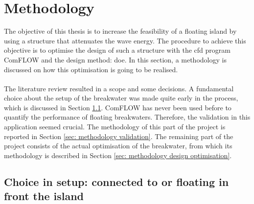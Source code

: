 \chapter{Methodology}
\label{ch: methodolgy}

The objective of this thesis is to increase the feasibility of a floating island by using a structure that attenuates the wave energy. The procedure to achieve this objective is to optimise the design of such a structure with the \acrfull{cfd} program ComFLOW and the design method: \acrfull{doe}. In this section, a methodology is discussed on how this optimisation is going to be realised. \\
\\
The literature review resulted in a scope and some decisions. A fundamental choice about the setup of the breakwater was made quite early in the process, which is discussed in Section \ref{sec: choice setup}. ComFLOW has never been used before to quantify the performance of floating breakwaters. Therefore, the validation in this application seemed crucial. The methodology of this part of the project is reported in Section \ref{sec: methodology validation}. The remaining part of the project consists of the actual optimisation of the breakwater, from which its methodology is described in Section \ref{sec: methodology design optimisation}. \\



\section{Choice in setup: connected to or floating in front the island}
\label{sec: choice setup}


